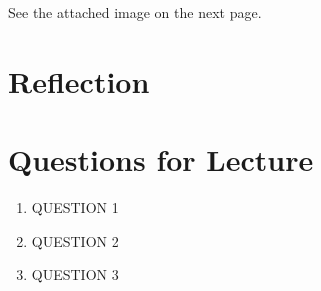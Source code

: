 \documentclass[12pt]{article}
\begin{document}
See the attached image on the next page.

% 

\section{Reflection}

\section{Questions for Lecture}

\begin{enumerate}
  \item QUESTION 1
  \item QUESTION 2
  \item QUESTION 3
\end{enumerate}



\end{document}
